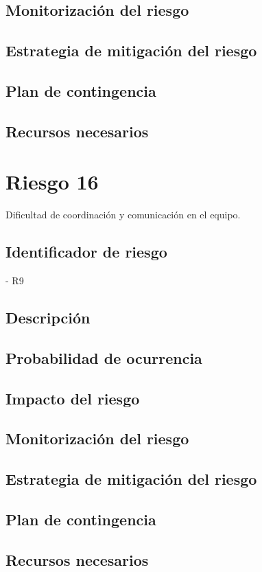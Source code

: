 \subsection{Monitorización del riesgo}
\subsection{Estrategia de mitigación del riesgo}
\subsection{Plan de contingencia}
\subsection{Recursos necesarios}

\section{Riesgo 16}

Dificultad de coordinación y comunicación en el equipo.

\subsection{Identificador de riesgo}
- R9
\subsection{Descripción}
\subsection{Probabilidad de ocurrencia}
\subsection{Impacto del riesgo}
\subsection{Monitorización del riesgo}
\subsection{Estrategia de mitigación del riesgo}
\subsection{Plan de contingencia}
\subsection{Recursos necesarios}

